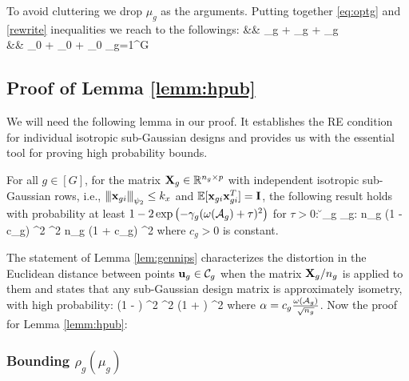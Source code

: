 \begin{IEEEproof}
	To avoid cluttering we drop $\mu_g$ as the arguments.
	Putting together \eqref{eq:optg} and \eqref{rewrite} inequalities we reach to the followings: 
	\be 
	\nr 
	 &\leq&   \rho_g   +  \xi_g  + \phi_g  
	\\ \nr 
	 &\leq& \rho_0  + \xi_0  + \mu_0 \sum_{g=1}^{G}     
	\ee 
\end{IEEEproof}

\subsection{Proof of Lemma \ref{lemm:hpub}}
We will need the following lemma in our proof. 
It establishes the RE condition for individual isotropic sub-Gaussian designs and provides us with the essential tool for proving high probability bounds.  
\begin{lemma}
	\label{lem:gennips}
	For all $g \in [G]$, for the matrix $\mathbf{X}_g \in \mathbb R^{n_g \times p}$ with independent isotropic sub-Gaussian rows, i.e., ${\left\vert\kern-0.25ex\left\vert\kern-0.25ex\left\vert \mathbf{x}_{gi} \right\vert\kern-0.25ex\right\vert\kern-0.25ex\right\vert}_{\psi_2} \leq k_x$ and $\mathbb{E}[\mathbf{x}_{gi} \mathbf{x}_{gi}^T] = \mathbf{I}$, the following result holds with probability at least $1 - 2\exp\left( -\gamma_g (\omega(\cA_g) + \tau)^2  \right)$ for $\tau > 0$:
	\be 
	\nr 
	\forall \u_g \in \cC_g: n_g \left(1 -  c_g\right) ^2  \leq {}^2 \leq n_g \left(1 +  c_g\right) ^2
	\ee 
	where $c_g > 0$ is constant.%
\end{lemma} 

The statement of Lemma \ref{lem:gennips} characterizes the distortion in the Euclidean distance between points $\u_g \in \cC_g$ when the matrix $\mathbf{X}_g/n_g$ is applied to them and states that any sub-Gaussian design matrix is approximately isometry, with high probability:
\be 
\nr 
(1 -  \alpha) ^2 \leq {}^2 \leq (1 + \alpha) ^2
\ee 
where $\alpha = c_g \frac{\omega(\cA_g)}{\sqrt{n_g}}$.
Now the proof for Lemma \ref{lemm:hpub}: 
\subsubsection{Bounding $\rho_g(\mu_g)$}

